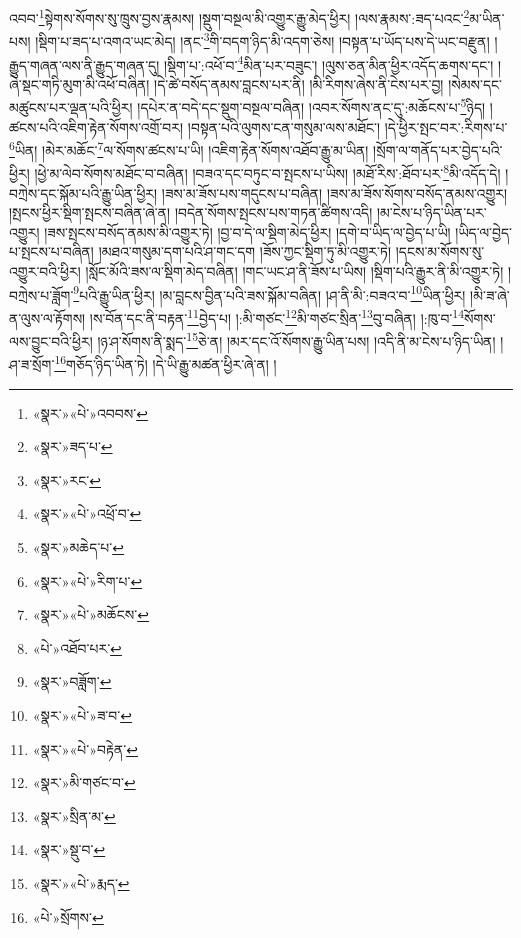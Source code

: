 འབབ་\footnote{«སྣར་»«པེ་»འབབས་}སྟེགས་སོགས་སུ་ཁྲུས་བྱས་རྣམས། །སྡུག་བསྔལ་མི་འགྱུར་རྒྱུ་མེད་ཕྱིར། །ལས་རྣམས་:ཟད་པའང་\footnote{«སྣར་»ཟད་པ་}མ་ཡིན་པས། །སྡིག་པ་ཟད་པ་འགའ་ཡང་མེད། །ནང་\footnote{«སྣར་»རང་}གི་བདག་ཉིད་མི་འདག་ཅེས། །བསྟན་པ་ཡོད་པས་དེ་ཡང་བརྫུན། །རྒྱུད་གཞན་ལས་ནི་རྒྱུད་གཞན་དུ། །སྡིག་པ་:འཕོ་བ་\footnote{«སྣར་»«པེ་»འཕྲོ་བ་}མིན་པར་བཟུང་། །ལུས་ཅན་མིན་ཕྱིར་འདོད་ཆགས་དང་། །ཞེ་སྡང་གཏི་མུག་མི་འཕོ་བཞིན། །དེ་ཚེ་བསོད་ནམས་བླངས་པར་ནི། །མི་རིགས་ཞེས་ནི་ངེས་པར་བྱ། །སེམས་དང་མཚུངས་པར་ལྡན་པའི་ཕྱིར། །དཔེར་ན་བདེ་དང་སྡུག་བསྔལ་བཞིན། །འབར་སོགས་ནང་དུ་:མཆོངས་པ་\footnote{«སྣར་»མཆེད་པ་}ཉིད། །ཚངས་པའི་འཇིག་རྟེན་སོགས་འགྲོ་བར། །བསྟན་པའི་ལུགས་ངན་གསུམ་ལས་མཐོང་། །དེ་ཕྱིར་སྤང་བར་:རིགས་པ་\footnote{«སྣར་»«པེ་»རིག་པ་}ཡིན། །མེར་མཆོང་\footnote{«སྣར་»«པེ་»མཆོངས་}ལ་སོགས་ཚངས་པ་ཡི། །འཇིག་རྟེན་སོགས་འཐོབ་རྒྱུ་མ་ཡིན། །སྲོག་ལ་གནོད་པར་བྱེད་པའི་ཕྱིར། །ཕྱེ་མ་ལེབ་སོགས་མཐོང་བ་བཞིན། །བཟའ་དང་བཏུང་བ་སྤངས་པ་ཡིས། །མཐོ་རིས་:ཐོབ་པར་\footnote{«པེ་»འཐོབ་པར་}མི་འདོད་དེ། །བཀྲེས་དང་སྐོམ་པའི་རྒྱུ་ཡིན་ཕྱིར། །ཟས་མ་ཟོས་པས་གདུངས་པ་བཞིན། །ཟས་མ་ཟོས་སོགས་བསོད་ནམས་འགྱུར། །སྤངས་ཕྱིར་སྡིག་སྤངས་བཞིན་ཞེ་ན། །བདེན་སོགས་སྤངས་པས་གཏན་ཚིགས་འདི། །མ་ངེས་པ་ཉིད་ཡིན་པར་འགྱུར། །ཟས་སྤངས་བསོད་ནམས་མི་འགྱུར་ཏེ། །བྱ་བ་དེ་ལ་སྡིག་མེད་ཕྱིར། །དགེ་བ་ཡིད་ལ་བྱེད་པ་ཡི། །ཡིད་ལ་བྱེད་པ་སྤངས་པ་བཞིན། །མཐའ་གསུམ་དག་པའི་ཤ་གང་དག །ཟོས་ཀྱང་སྡིག་ཏུ་མི་འགྱུར་ཏེ། །དངས་མ་སོགས་སུ་འགྱུར་བའི་ཕྱིར། །སློང་མོའི་ཟས་ལ་སྡིག་མེད་བཞིན། །གང་ཡང་ཤ་ནི་ཟོས་པ་ཡིས། །སྡིག་པའི་རྒྱུར་ནི་མི་འགྱུར་ཏེ། །བཀྲེས་པ་ཟློག་\footnote{«སྣར་»བཟློག་}པའི་རྒྱུ་ཡིན་ཕྱིར། །མ་བླངས་བྱིན་པའི་ཟས་སྐོམ་བཞིན། །ཤ་ནི་མི་:བཟའ་བ་\footnote{«སྣར་»«པེ་»ཟ་བ་}ཡིན་ཕྱིར། །མི་ཟ་ཞེ་ན་ལུས་ལ་རྟོགས། །ས་བོན་དང་ནི་བརྟན་\footnote{«སྣར་»«པེ་»བརྟེན་}བྱེད་པ། །:མི་གཙང་\footnote{«སྣར་»མི་གཙང་བ་}མི་གཙང་སྲིན་\footnote{«སྣར་»སྲིན་མ་}བུ་བཞིན། །:ཁུ་བ་\footnote{«སྣར་»སྡུ་བ་}སོགས་ལས་བྱུང་བའི་ཕྱིར། །ཉ་ཤ་སོགས་ནི་སྨད་\footnote{«སྣར་»«པེ་»རྨད་}ཅེ་ན། །མར་དང་འོ་སོགས་རྒྱུ་ཡིན་པས། །འདི་ནི་མ་ངེས་པ་ཉིད་ཡིན། །ཤ་ཟ་སྲོག་\footnote{«པེ་»སྲོགས་}གཅོད་ཉིད་ཡིན་ཏེ། །དེ་ཡི་རྒྱུ་མཚན་ཕྱིར་ཞེ་ན། །
